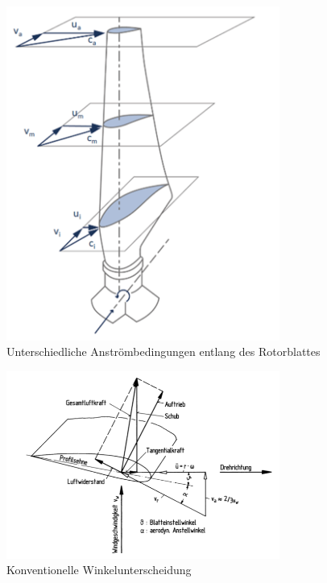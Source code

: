 \begin{figure}[htbp] %
    \centering %
    \includegraphics[width=0.8\textwidth]{figures/verwindung.png} %
    \caption{Unterschiedliche Anströmbedingungen entlang des Rotorblattes \cite{noauthor_aerodynamik_nodate}} %
    \label{fig:verwindung} %
\end{figure}

\begin{figure}[htbp] %
    \centering %
    \includegraphics[width=0.8\textwidth]{figures/kraft_an_blatt.png} %
    \caption{Konventionelle Winkelunterscheidung \cite{hau_physikalische_2016}} %
    \label{fig:kraft_an_blatt} %
\end{figure}

